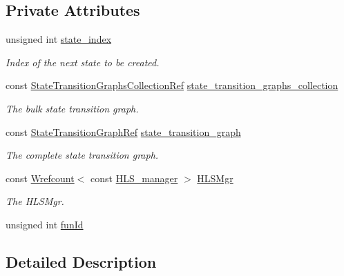 \subsection*{Private Attributes}
\begin{DoxyCompactItemize}
\item 
unsigned int \hyperlink{classStateTransitionGraph__constructor_ac895cf64e96b2d84f4706f81b0cf09b7}{state\+\_\+index}
\begin{DoxyCompactList}\small\item\em Index of the next state to be created. \end{DoxyCompactList}\item 
const \hyperlink{state__transition__graph_8hpp_a2613a37dfdde13c61d36bfaba91f433e}{State\+Transition\+Graphs\+Collection\+Ref} \hyperlink{classStateTransitionGraph__constructor_afe8681a397d20043b1c0910c29e9bdc9}{state\+\_\+transition\+\_\+graphs\+\_\+collection}
\begin{DoxyCompactList}\small\item\em The bulk state transition graph. \end{DoxyCompactList}\item 
const \hyperlink{state__transition__graph_8hpp_a50ba60cd5e113de254d5d7638bbbba86}{State\+Transition\+Graph\+Ref} \hyperlink{classStateTransitionGraph__constructor_ace30bb027ffcf699d0cb7b540347327d}{state\+\_\+transition\+\_\+graph}
\begin{DoxyCompactList}\small\item\em The complete state transition graph. \end{DoxyCompactList}\item 
const \hyperlink{classWrefcount}{Wrefcount}$<$ const \hyperlink{classHLS__manager}{H\+L\+S\+\_\+manager} $>$ \hyperlink{classStateTransitionGraph__constructor_a7ff10711b43bdd70928e531ca60fbbb6}{H\+L\+S\+Mgr}
\begin{DoxyCompactList}\small\item\em The H\+L\+S\+Mgr. \end{DoxyCompactList}\item 
unsigned int \hyperlink{classStateTransitionGraph__constructor_a6468cf200b8eb5aea034ce1d7b9fbb61}{fun\+Id}
\end{DoxyCompactItemize}


\subsection{Detailed Description}



